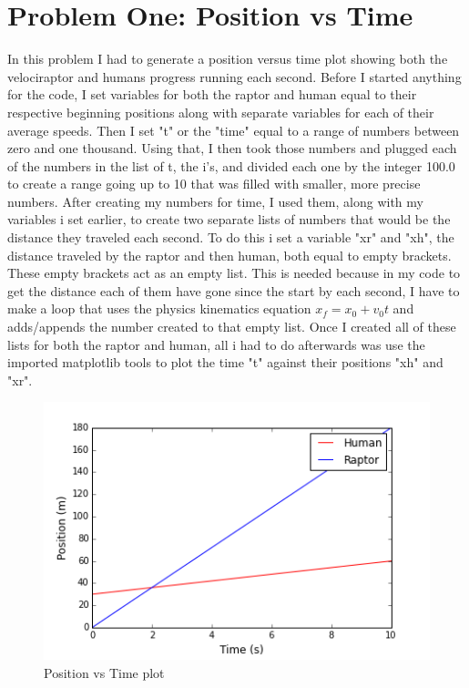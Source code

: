 \documentclass[twocolumn]{revtex4}
\begin{document}
\section{Problem One: Position vs Time}
	In this problem I had to generate a position versus time plot showing both the velociraptor and humans progress running each second. Before I started anything for the code, I set variables for both the raptor and human equal to their respective beginning positions along with separate variables for each of their average speeds. Then I set "t" or the "time" equal to a range of numbers between zero and one thousand. Using that, I then took those numbers and plugged each of the numbers in the list of t, the i's, and divided each one by the integer 100.0 to create a range going up to 10 that was filled with smaller, more precise numbers. After creating my numbers for time, I used them, along with my variables i set earlier, to create two separate lists of numbers that would be the distance they traveled each second. To do this i set a variable "xr" and "xh", the distance traveled by the raptor and then human, both equal to empty brackets. These empty brackets act as an empty list. This is needed because in my code to get the distance each of them have gone since the start by each second, I have to make a loop that uses the physics kinematics equation $ x_f = x_0 + v_0 t$ and adds/appends the number created to that empty list. Once I created all of these lists for both the raptor and human, all i had to do afterwards was use the imported matplotlib tools to plot the time "t" against their positions "xh" and "xr".  
\begin{figure}[h]
	\centering
	\includegraphics[width=.5\textwidth]{RaptorvHuman_Finnegan.png}
	\caption{Position vs Time plot \label{fig:Position vs Time plot}}
\end{figure}
\end{document}
